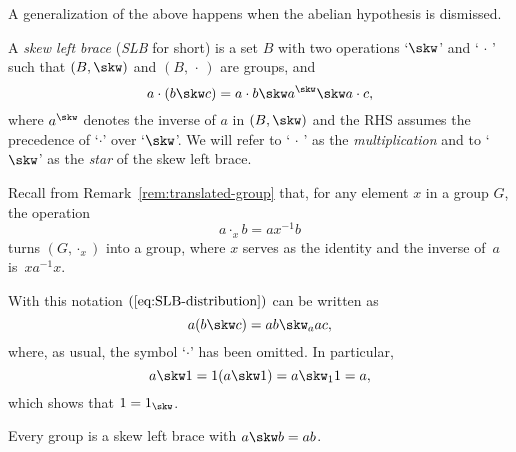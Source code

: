 A generalization of the above happens when the abelian hypothesis is dismissed.

\begin{defn}
      A \textsl{skew left brace} (\textsl{SLB} for short) is a set\/ $B$ with two operations\/ `$\skw$' and\/ `$\,\cdot\,$' such that\/ $(B,\skw)$ and\/ $(B,\,\cdot\,)$ are groups, and
    \begin{equation}\label{eq:SLB-distribution}
        a\cdot (b\skw c) = a\cdot b\skw a^\skw\skw a\cdot c,
    \end{equation}
    where\/ $a^\skw$ denotes the inverse of\/ $a$ in\/ $(B,\skw)$ and the RHS assumes the precedence of\/ `$\cdot$' over `$\skw$'. We will refer to `$\,\cdot\,$' as the \textsl{multiplication\/} and to `$\skw$' as the \textsl{star} of the skew left brace.
\end{defn}

\begin{rem}
    Recall from\/ \textrm{\rm Remark~\ref{rem:translated-group}} that, for any element $x$ in a group $G$, the operation
    $$
        a\cdot_x b = ax^{-1}b
    $$
    turns $(G,\cdot_x)$ into a group, where $x$ serves as the identity and the inverse of~$a$ is~$xa^{-1}x$.

    With this notation $(\ref{eq:SLB-distribution})$ can be written as
    \begin{equation}\label{eq:skew-left-brace-translated}
        a(b\skw c) = ab\skw_a ac,
    \end{equation}
    where, as usual, the symbol `$\cdot$' has been omitted. In particular,
    $$
        a\skw1=1(a\skw1) = a\skw_11= a,
    $$
    which shows that $1=1_{\skw}$.
\end{rem}

\begin{rem}
    Every group is a skew left brace with $a\skw b=ab$.
\end{rem}

